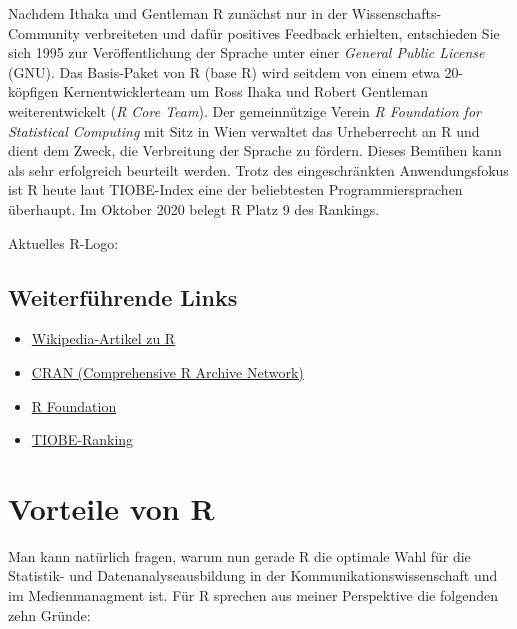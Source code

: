 \documentclass[
]{book}
\providecommand{\tightlist}{%
  \setlength{\itemsep}{0pt}\setlength{\parskip}{0pt}}
\begin{document}
Nachdem Ithaka und Gentleman R zunächst nur in der Wissenschafts-Community verbreiteten und dafür
positives Feedback erhielten, entschieden Sie sich 1995 zur Veröffentlichung der Sprache unter einer
\emph{General Public License} (GNU).
Das Basis-Paket von R (base R) wird seitdem von einem etwa 20-köpfigen Kernentwicklerteam um Ross Ihaka und Robert
Gentleman weiterentwickelt (\emph{R Core Team}).
Der gemeinnützige Verein \emph{R Foundation for Statistical Computing} mit Sitz in Wien verwaltet das Urheberrecht an R
und dient dem Zweck, die Verbreitung der Sprache zu fördern.
Dieses Bemühen kann als sehr erfolgreich beurteilt werden.
Trotz des eingeschränkten Anwendungsfokus ist R heute laut TIOBE-Index eine der beliebtesten Programmiersprachen überhaupt. Im Oktober 2020 belegt R Platz 9 des Rankings.

Aktuelles R-Logo:

\hypertarget{weiterfuxfchrende-links}{%
\subsection*{Weiterführende Links}\label{weiterfuxfchrende-links}}

\begin{itemize}
\tightlist
\item
  \href{https://de.wikipedia.org/wiki/R_(Programmiersprache)}{Wikipedia-Artikel zu R}
\item
  \href{https://cran.r-project.org/}{CRAN (Comprehensive R Archive Network)}
\item
  \href{https://www.r-project.org/foundation/}{R Foundation}
\item
  \href{https://www.tiobe.com/tiobe-index/}{TIOBE-Ranking}
\end{itemize}

\hypertarget{vorteile-von-r}{%
\section{Vorteile von R}\label{vorteile-von-r}}

Man kann natürlich fragen, warum nun gerade R die optimale Wahl für die Statistik- und Datenanalyseausbildung in der Kommunikationswissenschaft und im Medienmanagment ist. Für R sprechen aus meiner Perspektive die folgenden zehn Gründe:
\end{document}
